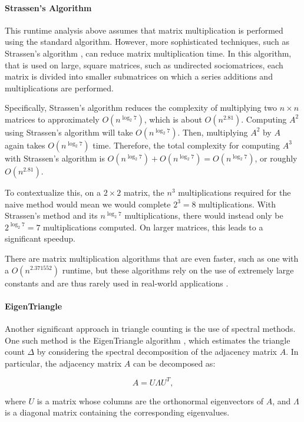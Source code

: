 \documentclass[11pt, margin=1in]{article}
\begin{document}
\paragraph{Strassen's Algorithm}

This runtime analysis above assumes that matrix multiplication is performed using the standard algorithm.
However, more sophisticated techniques, such as Strassen's algorithm \cite{strassen_gaussian_1969}, can reduce matrix multiplication time.
In this algorithm, that is used on large, square matrices, such as undirected sociomatrices, each matrix is divided into smaller submatrices on which a series additions and multiplications are performed.

Specifically, Strassen's algorithm reduces the complexity of multiplying two $n \times n$ matrices to approximately $O(n^{\log_2 7})$, which is about $O(n^{2.81})$.
Computing $A^2$ using Strassen's algorithm will take $O(n^{\log_2 7})$.
Then, multiplying $A^2$ by $A$ again takes $O(n^{\log_2 7})$ time.
Therefore, the total complexity for computing $A^3$ with Strassen's algorithm is $O(n^{\log_2 7}) + O(n^{\log_2 7}) = O(n^{\log_2 7})$, or roughly $O(n^{2.81})$.

To contextualize this, on a $2 \times 2$ matrix, the $n^3$ multiplications required for the naive method would mean we would complete $2^3 = 8$ multiplications.
With Strassen's method and its $n^{\log_2 7}$ multiplications, there would instead only be $2^{\log_2 7} = 7$ multiplications computed.
On larger matrices, this leads to a significant speedup.

There are matrix multiplication algorithms that are even faster, such as one with a $O(n^{2.371552})$ runtime, but these algorithms rely on the use of extremely large constants and are thus rarely used in real-world applications \cite{williams_new_2023}.

\paragraph{EigenTriangle}

Another significant approach in triangle counting is the use of spectral methods.
One such method is the EigenTriangle algorithm \cite{tsourakakis_fast_2008}, which estimates the triangle count $\Delta$ by considering the spectral decomposition of the adjacency matrix $A$.
In particular, the adjacency matrix $A$ can be decomposed as:

\[
A = U \Lambda U^T,
\]

where $U$ is a matrix whose columns are the orthonormal eigenvectors of $A$, and $\Lambda$ is a diagonal matrix containing the corresponding eigenvalues.
\end{document}
